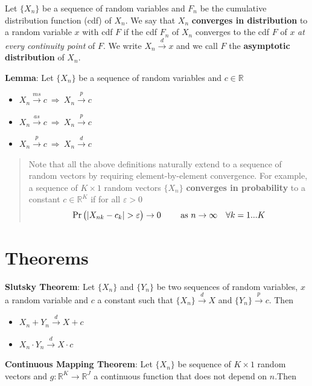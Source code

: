 \documentclass[12pt,]{book}
\providecommand{\tightlist}{%
  \setlength{\itemsep}{0pt}\setlength{\parskip}{0pt}}
\begin{document}
Let \(\{ X_n \}\) be a sequence of random variables and \(F_n\) be the cumulative distribution function (cdf) of \(X_n\). We say that \(X_n\) \textbf{converges in distribution} to a random variable \(x\) with cdf \(F\) if the cdf \(F_n\) of \(X_n\) converges to the cdf \(F\) of \(x\) \emph{at every continuity point} of \(F\). We write \(X_n \overset{d}{\to} x\) and we call \(F\) the \textbf{asymptotic distribution} of \(X_n\).

\textbf{Lemma}:
Let \(\{ X_n \}\) be a sequence of random variables and \(c \in \mathbb R\)

\begin{itemize}
\tightlist
\item
  \(X_n \overset{ms}{\to} c \ \Rightarrow \ X_n \overset{p}{\to} c\)
\item
  \(X_n \overset{as}{\to} c \ \Rightarrow \ X_n \overset{p}{\to} c\)
\item
  \(X_n \overset{p}{\to} c \ \Rightarrow \ X_n \overset{d}{\to} c\)
\end{itemize}

\begin{quote}
Note that all the above definitions naturally extend to a sequence of random vectors by requiring element-by-element convergence. For example, a sequence of \(K \times 1\) random vectors \(\{ X_n \}\) \textbf{converges in probability} to a constant \(c \in \mathbb R^K\) if for all \(\varepsilon>0\)
\[
\Pr \big( |X _ {nk} - c_k| > \varepsilon \big) \to 0 \qquad \text{ as } n \to \infty \quad \forall k = 1...K \\
\]
\end{quote}

\hypertarget{theorems-1}{%
\section{Theorems}\label{theorems-1}}

\textbf{Slutsky Theorem}:
Let \(\{ X_n \}\) and \(\{ Y_n \}\) be two sequences of random variables, \(x\) a random variable and \(c\) a constant such that \(\{ X_n \} \overset{d}{\to} X\) and \(\{ Y_n \} \overset{p}{\to} c\). Then

\begin{itemize}
\tightlist
\item
  \(X_n + Y_n \overset{d}{\to} X + c\)
\item
  \(X_n \cdot Y_n \overset{d}{\to} X \cdot c\)
\end{itemize}

\textbf{Continuous Mapping Theorem}:
Let \(\{ X_n \}\) be sequence of \(K \times 1\) random vectors and \(g: \mathbb{R}^K \to \mathbb{R}^J\) a continuous function that does not depend on \(n\).Then
\end{document}
